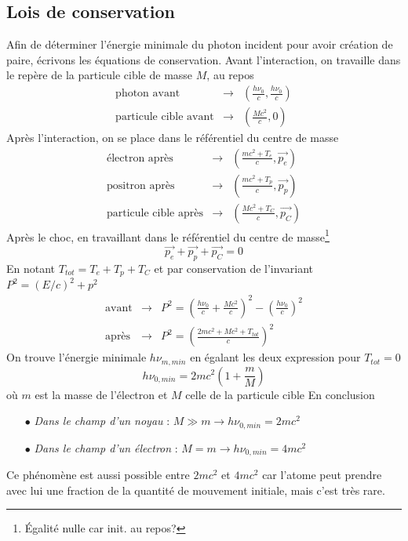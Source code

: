 \subsection{Lois de conservation}%
Afin de déterminer l'énergie minimale du photon incident pour avoir création de paire, écrivons 
les équations de conservation. Avant l'interaction, on travaille dans le repère de la particule
cible de masse $M$, au repos
\begin{eqnarray}
\mbox{photon avant} &\rightarrow& \left(\frac{h\nu_0}{c},\frac{h\nu_0}{c}\right)\\
\mbox{particule cible avant} &\rightarrow& \left(\frac{Mc^2}{c},0\right)
\end{eqnarray}
Après l'interaction, on se place dans le référentiel du centre de masse
\begin{eqnarray}
\mbox{\'electron apr\`es} &\rightarrow& \left(\frac{mc^2+T_e}{c},\overrightarrow{p_e}\right)\\
\mbox{positron apr\`es} &\rightarrow& \left(\frac{mc^2+T_p}{c},\overrightarrow{p_p}\right)\\
\mbox{particule cible apr\`es} &\rightarrow& \left(\frac{Mc^2+T_C}{c},\overrightarrow{p_C}\right)
\end{eqnarray}
Après le choc, en travaillant dans le référentiel du centre de masse\footnote{Égalité nulle car
init. au repos?}
\begin{equation}
\overrightarrow{p_e}+\overrightarrow{p_p}+\overrightarrow{p_C}=0
\end{equation}
En notant $T_{tot} = T_e+T_p+T_C$ et par conservation de l'invariant $P^2=(E/c)^2+p^2$
\begin{eqnarray}
\mbox{avant} &\rightarrow& P^2=\left(\frac{h\nu_0}{c}+\frac{Mc^2}{c}\right)^2-\left(\frac{h\nu_0}{c}\right)^2\\
\mbox{apr\`es} &\rightarrow& P^2=\left(\frac{2mc^2+Mc^2+T_{tot}}{c}\right)^2
\end{eqnarray}
On trouve l'énergie minimale $h\nu_{m,min}$ en égalant les deux expression pour $T_{tot}=0$
\begin{equation}
h\nu_{0,min}=2mc^2\left(1+\frac{m}{M}\right)
\end{equation}
où $m$ est la masse de l'électron et $M$ celle de la particule cible
En conclusion
\begin{itemize}
\item[$\bullet$] \textit{Dans le champ d'un noyau} : $M\gg m \to h\nu_{0,min} = 2mc^2$
\item[$\bullet$] \textit{Dans le champ d'un électron} : $M= m \to h\nu_{0,min} = 4mc^2$
\end{itemize}
Ce phénomène est aussi possible entre $2mc^2$ et $4mc^2$ car l'atome peut prendre avec lui
une fraction de la quantité de mouvement initiale, mais c'est très rare.

